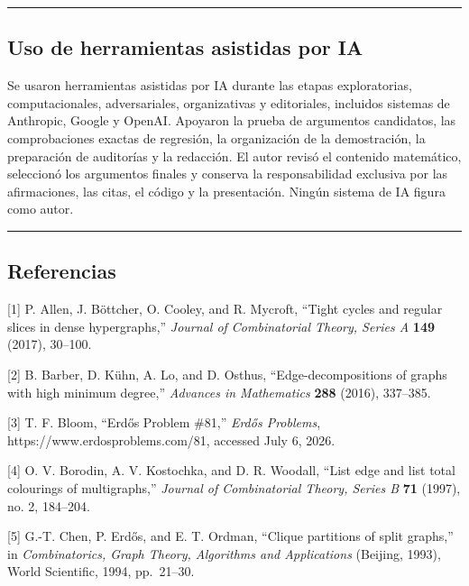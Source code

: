 \documentclass[
  11pt,
]{article}
\begin{document}
\begin{center}\rule{0.5\linewidth}{0.5pt}\end{center}

\subsection{Uso de herramientas asistidas por
IA}\label{uso-de-herramientas-asistidas-por-ia}

Se usaron herramientas asistidas por IA durante las etapas
exploratorias, computacionales, adversariales, organizativas y
editoriales, incluidos sistemas de Anthropic, Google y OpenAI. Apoyaron
la prueba de argumentos candidatos, las comprobaciones exactas de
regresión, la organización de la demostración, la preparación de
auditorías y la redacción. El autor revisó el contenido matemático,
seleccionó los argumentos finales y conserva la responsabilidad
exclusiva por las afirmaciones, las citas, el código y la presentación.
Ningún sistema de IA figura como autor.

\begin{center}\rule{0.5\linewidth}{0.5pt}\end{center}

\subsection{Referencias}\label{referencias}

{[}1{]} P. Allen, J. Böttcher, O. Cooley, and R. Mycroft, ``Tight cycles
and regular slices in dense hypergraphs,'' \emph{Journal of
Combinatorial Theory, Series A} \textbf{149} (2017), 30--100.

{[}2{]} B. Barber, D. Kühn, A. Lo, and D. Osthus, ``Edge-decompositions
of graphs with high minimum degree,'' \emph{Advances in Mathematics}
\textbf{288} (2016), 337--385.

{[}3{]} T. F. Bloom, ``Erdős Problem \#81,'' \emph{Erdős Problems},
https://www.erdosproblems.com/81, accessed July 6, 2026.

{[}4{]} O. V. Borodin, A. V. Kostochka, and D. R. Woodall, ``List edge
and list total colourings of multigraphs,'' \emph{Journal of
Combinatorial Theory, Series B} \textbf{71} (1997), no. 2, 184--204.

{[}5{]} G.-T. Chen, P. Erdős, and E. T. Ordman, ``Clique partitions of
split graphs,'' in \emph{Combinatorics, Graph Theory, Algorithms and
Applications} (Beijing, 1993), World Scientific, 1994, pp.~21--30.
\end{document}
